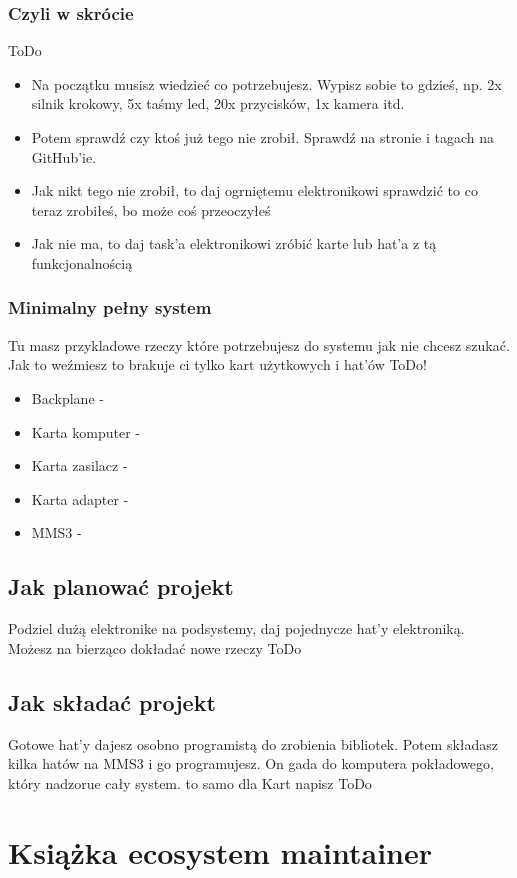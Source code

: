 \documentclass[b5paper, 10pt, twoside]{book}
\begin{document}
\subsection{Czyli w skrócie}
ToDo
\begin{itemize}
  \item Na początku musisz wiedzieć co potrzebujesz. Wypisz sobie to gdzieś, np. 2x silnik krokowy, 5x taśmy led, 20x przycisków, 1x kamera itd.
  \item Potem sprawdź czy ktoś już tego nie zrobił. Sprawdź na stronie i tagach na GitHub'ie. 
  \item Jak nikt tego nie zrobił, to daj ogrniętemu elektronikowi sprawdzić to co teraz zrobiłeś, bo może coś przeoczyłeś
  \item Jak nie ma, to daj task'a elektronikowi zróbić karte lub hat'a z tą funkcjonalnością
\end{itemize}
 
\subsection{Minimalny pełny system}
Tu masz przykladowe rzeczy które potrzebujesz do systemu jak nie chcesz szukać. Jak to weźmiesz to brakuje ci tylko kart użytkowych i hat'ów
ToDo!
\begin{itemize}
  \item Backplane -
  \item Karta komputer -
  \item Karta zasilacz -
  \item Karta adapter - 
  \item MMS3 -
\end{itemize}

\section{Jak planować projekt}
Podziel dużą elektronike na podsystemy, daj pojednycze hat'y elektroniką. Możesz na bierząco dokładać nowe rzeczy
ToDo

\section{Jak składać projekt}
Gotowe hat'y dajesz osobno programistą do zrobienia bibliotek. Potem składasz kilka hatów na MMS3 i go programujesz. On gada do komputera pokładowego, który nadzorue cały system. to samo dla Kart napisz
ToDo

\chapter{Książka ecosystem maintainer}
\end{document}
